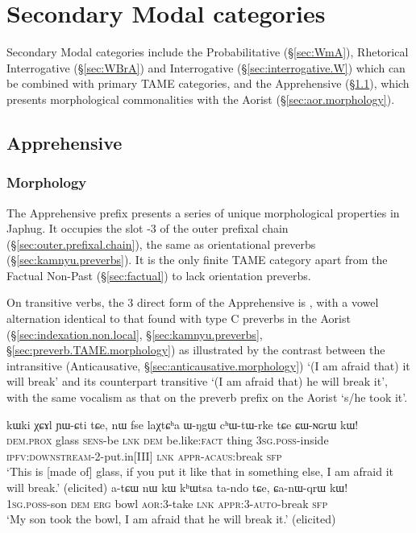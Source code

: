  
\section{Secondary Modal categories}  \label{sec:second.modal}
Secondary Modal categories include the Probabilitative (§\ref{sec:WmA}), Rhetorical Interrogative (§\ref{sec:WBrA}) and Interrogative (§\ref{sec:interrogative.W}) which can be combined with primary TAME categories, and the Apprehensive (§\ref{sec:apprehensive}), which presents morphological commonalities with the Aorist (§\ref{sec:aor.morphology}).

  \subsection{Apprehensive} \label{sec:apprehensive}
    \subsubsection{Morphology} \label{sec:apprehensive.morphology}
The Apprehensive prefix  presents a series of unique morphological properties in Japhug. It occupies the slot -3 of the outer prefixal chain (§\ref{sec:outer.prefixal.chain}), the same as orientational preverbs (§\ref{sec:kamnyu.preverbs}). It is the only finite TAME category apart from the Factual Non-Past (§\ref{sec:factual}) to lack orientation preverbs.

On transitive verbs, the 3\flobv{} direct form of the Apprehensive is , with a vowel alternation identical to that found with type C preverbs in the Aorist (§\ref{sec:indexation.non.local}, §\ref{sec:kamnyu.preverbs}, §\ref{sec:preverb.TAME.morphology}) as illustrated by the contrast between the intransitive (Anticausative, §\ref{sec:anticausative.morphology})  `(I am afraid that) it will break' and its counterpart transitive  `(I am afraid that) he will break it', with the same vocalism as that on the preverb  prefix on the Aorist   `s/he took it'.

\begin{exe}
\ex \label{ex:NGrW.qrW}
\begin{xlist}
\ex \label{ex:CWNGrW}
\gll kɯki χɕɤl ɲɯ-ɕti tɕe, nɯ fse laχtɕʰa ɯ-ŋgɯ cʰɯ-tɯ-rke tɕe ɕɯ-ɴɢrɯ kɯ!  \\
\textsc{dem}.\textsc{prox} glass \textsc{sens}-be \textsc{lnk} \textsc{dem} be.like:\textsc{fact}  thing \textsc{3sg}.\textsc{poss}-inside \textsc{ipfv}:\textsc{downstream}-2-put.in[III] \textsc{lnk} \textsc{appr}-\textsc{acaus}:break \textsc{sfp} \\
\glt `This is [made of] glass, if you put it like that in something else, I am afraid it will break.' (elicited)
\ex \label{ex:CanWqrW}
\gll a-tɕɯ nɯ kɯ kʰɯtsa ta-ndo tɕe, ɕa-nɯ-qrɯ kɯ! \\
\textsc{1sg}.\textsc{poss}-son \textsc{dem} \textsc{erg} bowl \textsc{aor}:3\flobv{}-take \textsc{lnk} \textsc{appr}:3\flobv{}-\textsc{auto}-break \textsc{sfp} \\
\glt `My son took the bowl, I am afraid that he will break it.' (elicited)
\end{xlist}
 \end{exe}
 
